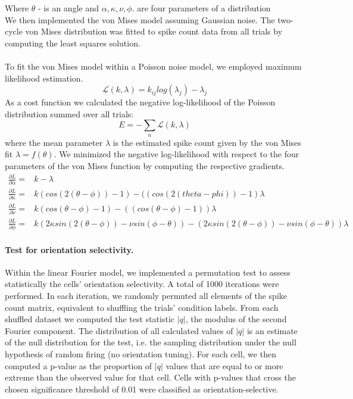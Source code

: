 \documentclass[10pt]{article}
\begin{document}
Where $\theta$ - is an angle and  $\alpha, \kappa, \nu, \phi.$ are four parameters of a distribution\\
We then implemented the von Mises model assuming Gaussian noise. The two-cycle von Mises distribution was fitted to spike count data from all trials by computing the least squares solution. \\ \\
To fit the von Mises model within a Poisson noise model, we employed maximum likelihood estimation. 
\begin{equation*}
\mathcal{L}(k,\lambda) = k_{ij}log(\lambda_j)-\lambda_j
\end{equation*}
As a cost function we calculated the negative log-likelihood of the Poisson distribution summed over all trials: 
\begin{equation}
E = - \sum_n \mathcal{L}(k,\lambda)
\end{equation}
where the mean parameter $\lambda$ is the estimated spike count given by the von Mises fit $\lambda = f(\theta)$. We minimized the negative log-likelihood with respect to the four parameters of the von Mises function by computing the respective gradients.
\begin{align*}
 \frac{\partial L}{\partial \alpha} = &k - \lambda  \\
 \frac{\partial L}{\partial \kappa} = &k(cos(2(\theta-\phi))-1) - ((cos(2(theta-phi))-1) \lambda \\
 \frac{\partial L}{\partial \nu} = &k(cos(\theta-\phi)-1) - ((cos(\theta-\phi)-1)) \lambda \\
 \frac{\partial L}{\partial \phi} =  & k(2\kappa sin(2(\theta-\phi)) - \nu sin(\phi-\theta)) -(2\kappa sin(2(\theta-\phi))- \nu sin(\phi-\theta)) \lambda
\end{align*}
\paragraph{Test for orientation selectivity.} Within the linear Fourier model, we implemented a permutation test to assess statistically the cells' orientation selectivity. A total of 1000 iterations were performed. In each iteration, we randomly permuted all elements of the spike count matrix, equivalent to shuffling the trials' condition labels. From each shuffled dataset we computed the test statistic $|q|$, the modulus of the second Fourier component. The distribution of all calculated values of $|q|$ is an estimate of the null distribution for the test, i.e. the sampling distribution under the null hypothesis of random firing (no orientation tuning). For each cell, we then computed a p-value as the proportion of $|q|$ values that are equal to or more extreme than the observed value for that cell. Cells with p-values that cross the chosen significance threshold of 0.01 were classified as orientation-selective.
\end{document}
